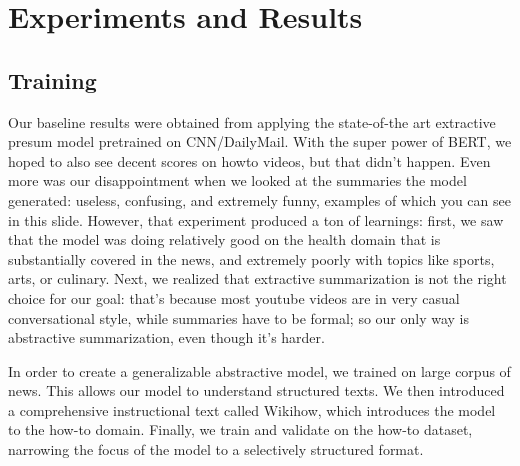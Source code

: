 \documentclass{article}
\begin{document}
\section{Experiments and Results}

\subsection{Training}
Our baseline results were obtained from applying the state-of-the art extractive presum model pretrained on CNN/DailyMail. With the super power of BERT, we hoped to also see decent scores on howto videos, but that didn’t happen. Even more was our disappointment when we looked at the summaries the model generated: useless, confusing, and extremely funny, examples of which you can see in this slide. However, that experiment produced a ton of learnings: first, we saw that the model was doing relatively good on the health domain that is substantially covered in the news, and extremely poorly with topics like sports, arts, or culinary. Next, we realized that extractive summarization is not the right choice for our goal: that’s because most youtube videos are in very casual conversational style, while summaries have to be formal; so our only way is abstractive summarization, even though it’s harder. 

In order to create a generalizable abstractive model, we trained on large corpus of news. This allows our model to understand structured texts. We then introduced a comprehensive instructional text called Wikihow, which introduces the model to the how-to domain. Finally, we train and validate on the how-to dataset, narrowing the focus of the model to a selectively structured format. 
\end{document}
